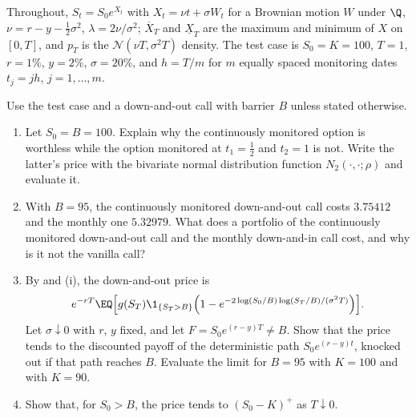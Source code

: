 
Throughout, $S_t=S_0e^{X_t}$ with $X_t=\nu t+\sigma W_t$ for a Brownian motion $W$ under $\Q$,
$\nu=r-y-\frac12\sigma^2$, $\lambda=2\nu/\sigma^2$; $\overline X_T$ and $\underline X_T$ are the maximum and
minimum of $X$ on $[0,T]$, and $p_T$ is the $\mathcal N(\nu T,\sigma^2T)$ density. The test case is
$S_0=K=100$, $T=1$, $r=1\%$, $y=2\%$, $\sigma=20\%$, and $h=T/m$ for $m$ equally spaced monitoring dates
$t_j=jh$, $j=1,\dots,m$.

\begin{exercise}\label{ex:bar-degenerate}
\easy Use the test case and a down-and-out call with barrier $B$ unless stated otherwise.
\begin{enumerate}[label=(\alph*)]
  \item Let $S_0=B=100$. Explain why the continuously monitored option is worthless while the
    option monitored at $t_1=\frac12$ and $t_2=1$ is not. Write the latter's price with the
    bivariate normal distribution function $N_2(\cdot,\cdot;\rho)$ and evaluate it.
  \item With $B=95$, the continuously monitored down-and-out call costs $3.75412$ and the
    monthly one $5.32979$. What does a portfolio of the continuously monitored down-and-out call
    and the monthly down-and-in call cost, and why is it not the vanilla call?
  \item By  and (i), the down-and-out
    price is
    \[
      e^{-rT}\EQ\Big[g(S_T)\1_{\{S_T>B\}}\Big(1-e^{-2\log(S_0/B)\log(S_T/B)/(\sigma^2T)}\Big)\Big].
    \]
    Let $\sigma\downarrow0$ with $r$, $y$ fixed, and let $F=S_0e^{(r-y)T}\ne B$. Show that the price
    tends to the discounted payoff of the deterministic path $S_0e^{(r-y)t}$, knocked out if that
    path reaches $B$. Evaluate the limit for $B=95$ with $K=100$ and with $K=90$.
  \item Show that, for $S_0>B$, the price tends to $(S_0-K)^+$ as $T\downarrow0$.
\end{enumerate}
\end{exercise}

